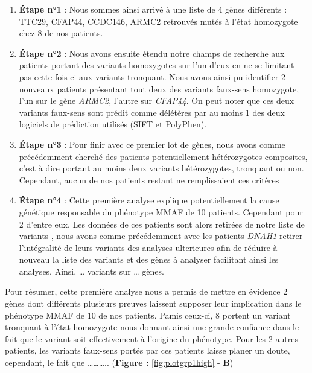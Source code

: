 \documentclass[12pt,twoside]{reedthesis}
\theoremstyle{definition}
\theoremstyle{definition}
\theoremstyle{remark}
\begin{document}
  \begin{enumerate}
  \def\labelenumi{\arabic{enumi}.}
  \item
    \textbf{Étape n°1} : Nous sommes ainsi arrivé à une liste de 4 gènes
    différents : TTC29, CFAP44, CCDC146, ARMC2 retrouvés mutés à l'état
    homozygote chez 8 de nos patients.
  \item
    \textbf{Étape n°2} : Nous avons ensuite étendu notre champs de
    recherche aux patients portant des variants homozygotes sur l'un d'eux
    en ne se limitant pas cette fois-ci aux variants tronquant. Nous avons
    ainsi pu identifier 2 nouveaux patients présentant tout deux des
    variants faux-sens homozygote, l'un sur le gène \emph{ARMC2}, l'autre
    sur \emph{CFAP44}. On peut noter que ces deux variants faux-sens sont
    prédit comme délétères par au moins 1 des deux logiciels de prédiction
    utilisés (SIFT et PolyPhen).
  \item
    \textbf{Étape n°3} : Pour finir avec ce premier lot de gènes, nous
    avons comme précédemment cherché des patients potentiellement
    hétérozygotes composites, c'est à dire portant au moins deux variants
    hétérozygotes, tronquant ou non. Cependant, aucun de nos patients
    restant ne remplissaient ces critères
  \item
    \textbf{Étape n°4} : Cette première analyse explique potentiellement
    la cause génétique responsable du phénotype MMAF de 10 patients.
    Cependant pour 2 d'entre eux, Les données de ces patients sont alors
    retirées de notre liste de variants , nous avons comme précédemment
    avec les patients \emph{DNAH1} retirer l'intégralité de leurs variants
    des analyses ulterieures afin de réduire à nouveau la liste des
    variants et des gènes à analyser facilitant ainsi les analyses. Ainsi,
    \ldots{} variants sur \ldots{} gènes.
  \end{enumerate}
  
  Pour résumer, cette première analyse nous a permis de mettre en évidence
  2 gènes dont différents plusieurs preuves laissent supposer leur
  implication dans le phénotype MMAF de 10 de nos patients. Pamis ceux-ci,
  8 portent un variant tronquant à l'état homozygote nous donnant ainsi
  une grande confiance dans le fait que le variant soit effectivement à
  l'origine du phénotype. Pour les 2 autres patients, les variants
  faux-sens portés par ces patients laisse planer un doute, cependant, le
  fait que \ldots{}\ldots{}\ldots{}.. (\textbf{Figure :
  }\ref{fig:plotgrp1high} - \textbf{B})
  
\end{document}
